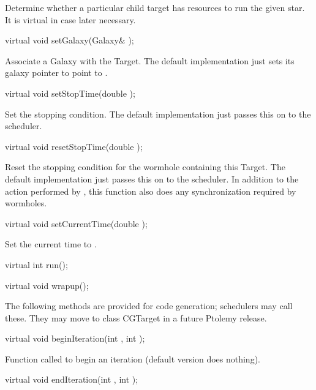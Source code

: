 Determine whether a particular child target has resources
to run the given star.  It is virtual in case later necessary.

\begin{example}
virtual void setGalaxy(Galaxy& );
\end{example}

Associate a Galaxy with the Target.  The default implementation
just sets its galaxy pointer  to point to .

\begin{example}
virtual void setStopTime(double );
\end{example}

Set the stopping condition.  The default implementation just passes
this on to the scheduler.

\begin{example}
virtual void resetStopTime(double );
\end{example}

Reset the stopping condition for the wormhole containing this Target.
The default implementation just passes this on to the scheduler.  In
addition to the action performed by , this function
also does any synchronization required by wormholes.

\begin{example}
virtual void setCurrentTime(double );
\end{example}

Set the current time to .

\begin{example}
virtual int run();
\end{example}

\begin{example}
virtual void wrapup();
\end{example}

The following methods are provided for code generation; schedulers may
call these.  They may move to class CGTarget in a future Ptolemy release.

\begin{example}
virtual void beginIteration(int , int );
\end{example}

Function called to begin an iteration (default version
does nothing).

\begin{example}
virtual void endIteration(int , int );
\end{example}

